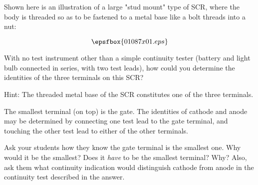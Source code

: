 

Shown here is an illustration of a large "stud mount" type of SCR, where the body is threaded so as to be fastened to a metal base like a bolt threads into a nut:

$$\epsfbox{01087x01.eps}$$

With no test instrument other than a simple continuity tester (battery and light bulb connected in series, with two test leads), how could you determine the identities of the three terminals on this SCR? 

\vskip 10pt

Hint:  The threaded metal base of the SCR constitutes one of the three terminals.







The smallest terminal (on top) is the gate.  The identities of cathode and anode may be determined by connecting one test lead to the gate terminal, and touching the other test lead to either of the other terminals.







Ask your students how they know the gate terminal is the smallest one.  Why would it be the smallest?  Does it {\it have} to be the smallest terminal?  Why?  Also, ask them what continuity indication would distinguish cathode from anode in the continuity test described in the answer.




